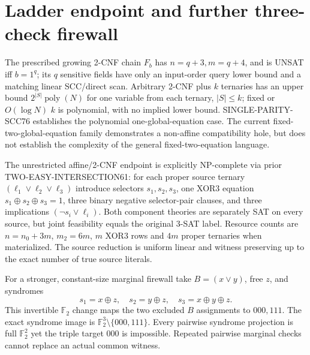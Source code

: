 \documentclass[11pt]{article}
\begin{document}
\section{Ladder endpoint and further three-check firewall}
The prescribed growing 2-CNF chain $F_b$ has $n=q+3,m=q+4$, and is UNSAT iff $b=1^q$; its $q$ sensitive fields have only an input-order query lower bound and a matching linear SCC/direct scan. Arbitrary 2-CNF plus $k$ ternaries has an upper bound $2^{|S|}\operatorname{poly}(N)$ for one variable from each ternary, $|S|\le k$; fixed or $O(\log N)$ $k$ is polynomial, with no implied lower bound. SINGLE-PARITY-SCC76 establishes the polynomial one-global-equation case. The current fixed-two-global-equation family demonstrates a non-affine compatibility hole, but does not establish the complexity of the general fixed-two-equation language.

The unrestricted affine/2-CNF endpoint is explicitly NP-complete via prior TWO-EASY-INTERSECTION61: for each proper source ternary $(\ell_1\vee\ell_2\vee\ell_3)$ introduce selectors $s_1,s_2,s_3$, one XOR3 equation $s_1\oplus s_2\oplus s_3=1$, three binary negative selector-pair clauses, and three implications $(\neg s_i\vee\ell_i)$. Both component theories are separately SAT on every source, but joint feasibility equals the original 3-SAT label. Resource counts are $n=n_0+3m$, $m_2=6m$, $m$ XOR3 rows and $4m$ proper ternaries when materialized. The source reduction is uniform linear and witness preserving up to the exact number of true source literals.

For a stronger, constant-size marginal firewall take $B=(x\vee y)$, free $z$, and syndromes
\[
s_1=x\oplus z,\quad s_2=y\oplus z,\quad s_3=x\oplus y\oplus z.
\]
This invertible $\mathbb F_2$ change maps the two excluded $B$ assignments to $000,111$. The exact syndrome image is $\mathbb F_2^3\setminus\{000,111\}$. Every pairwise syndrome projection is full $\mathbb F_2^2$ yet the triple target $000$ is impossible. Repeated pairwise marginal checks cannot replace an actual common witness.
\end{document}
